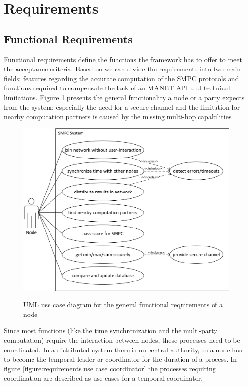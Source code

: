 	\section{Requirements}
	\label{Requirements}
	
	\subsection{Functional Requirements}
	\label{Functional Requirements}
	
	Functional requirements define the functions the framework has to offer to meet the acceptance criteria. Based on  we can divide the requirements into two main fields: features regarding the accurate computation of the \gls{SMPC} protocols and functions required to compensate the lack of an \gls{MANET} \gls{API} and technical limitations. 
	Figure \ref{figure:requirements use case node} presents the general functionality a node or a party expects from the system: especially the need for a secure channel and the limitation for nearby computation partners is caused by the missing multi-hop capabilities.
	
	\begin{figure}[!htb] %
	\caption{\gls{UML} use case diagram for the general functional requirements of a node}
	\includegraphics[scale=0.85]{figures/use-case-node.png}
	\label{figure:requirements use case node}
	\end{figure}

	Since most functions (like the time synchronization and the multi-party computation) require the interaction between nodes, these processes need to be coordinated. In a distributed system there is no central authority, so a node has to become the temporal leader or coordinator for the duration of a process. In figure \ref{figure:requirements use case coordinator} the processes requiring coordination are described as use cases for a temporal coordinator.
	
